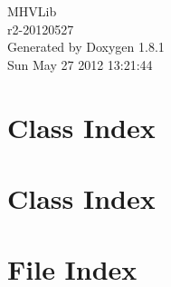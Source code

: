 \documentclass{book}
\begin{document}
\hypersetup{pageanchor=false,citecolor=blue}
\begin{titlepage}
\vspace*{7cm}
\begin{center}
{\Large M\-H\-V\-Lib \\[1ex]\large r2-\/20120527 }\\
\vspace*{1cm}
{\large Generated by Doxygen 1.8.1}\\
\vspace*{0.5cm}
{\small Sun May 27 2012 13:21:44}\\
\end{center}
\end{titlepage}
\clearemptydoublepage
{}
\tableofcontents
\clearemptydoublepage
{}
\hypersetup{pageanchor=true,citecolor=blue}
\chapter{Class Index}

\chapter{Class Index}

\chapter{File Index}

\end{document}
